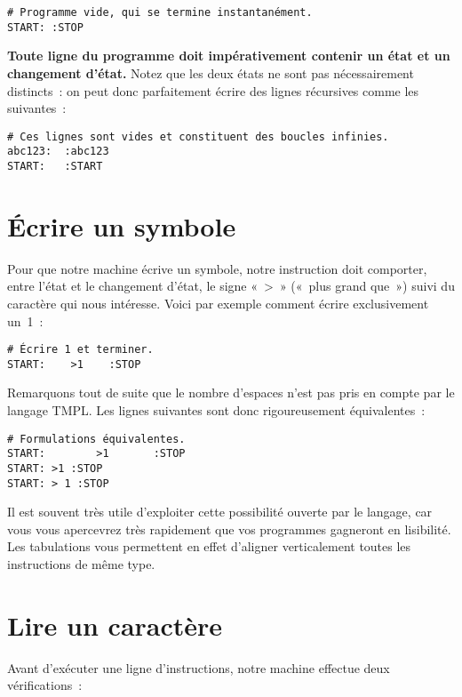 \documentclass[a4paper, 11pt]{report}
\begin{document}
\begin{verbatim}
# Programme vide, qui se termine instantanément.
START: :STOP
\end{verbatim}

\textbf{Toute ligne du programme doit impérativement contenir un état et
  un changement d'état.}  Notez que les deux états ne sont pas
nécessairement distincts~: on peut donc parfaitement écrire des lignes
récursives comme les suivantes~:


\begin{verbatim}
# Ces lignes sont vides et constituent des boucles infinies.
abc123:  :abc123 
START:   :START
\end{verbatim}


\section{Écrire un symbole}

Pour que notre machine écrive un symbole, notre instruction doit
comporter, entre l'état et le changement d'état, le signe «~>~»
(«~plus grand que~») suivi du caractère qui nous intéresse. Voici par
exemple comment écrire exclusivement un~1~:



\begin{verbatim}
# Écrire 1 et terminer.
START: 	  >1    :STOP
\end{verbatim}


Remarquons tout de suite que le nombre d'espaces n'est pas pris en
compte par le langage TMPL. Les lignes suivantes sont donc
rigoureusement équivalentes~:



\begin{verbatim}
# Formulations équivalentes.
START:        >1       :STOP
START: >1 :STOP
START: > 1 :STOP
\end{verbatim}


Il est souvent très utile d'exploiter cette possibilité ouverte par le
langage, car vous vous apercevrez très rapidement que vos programmes
gagneront en lisibilité. Les tabulations vous permettent en effet
d'aligner verticalement toutes les instructions de même type.



\section{Lire un caractère}

Avant d'exécuter une ligne d'instructions, notre machine effectue deux
vérifications~: 
\end{document}
